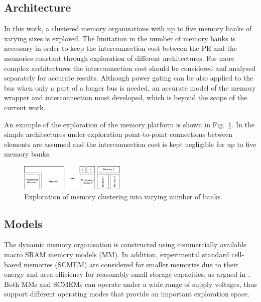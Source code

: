 \documentclass[a4paper,conference]{IEEEtran}
\begin{document}
\subsection{Architecture}

In this work, a clustered memory organisations with up to five memory banks of varying sizes is explored. The limitation in the number of memory banks is necessary in order to keep the interconnection cost between the PE and the memories constant through exploration of different architectures. For more complex architectures the interconnection cost should be considered and analysed separately for accurate results. Although power gating can be also applied to the bus when only a part of a longer bus is needed, an accurate model of the memory wrapper and interconnection must developed, which is beyond the scope of the current work. 

An example of the exploration of the memory platform is shown in Fig.~\ref{fig:platform}. In the simple architectures under exploration point-to-point connections between elements are assumed and the interconnection cost is kept negligible for up to five memory banks.

\begin{figure}[!t]
\centering
\includegraphics[width=0.45\textwidth]{Images/platform.eps}
\caption{Exploration of memory clustering into varying number of banks}
\label{fig:platform}
\end{figure}

\subsection{Models}

The dynamic memory organisation is constructed using commercially available macro SRAM memory models (MM). In addition, experimental standard cell-based memories (SCMEM) \cite{Mei11}  are  considered for smaller memories due to their energy and area efficiency for reasonably small storage capacities, as argued in \cite{Mei10}. Both MMs and SCMEMs can operate under a wide range of supply voltages, thus support different operating modes that provide an important exploration space.
\end{document}
